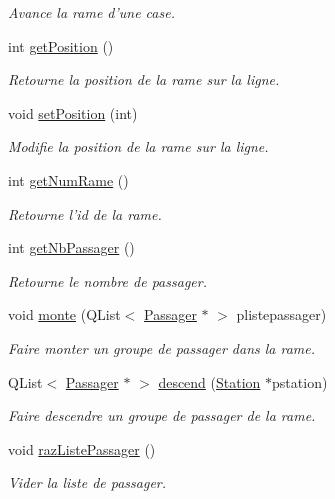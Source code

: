\begin{DoxyCompactItemize}
\begin{DoxyCompactList}\small\item\em Avance la rame d'une case. \item\end{DoxyCompactList}\item 
int \hyperlink{classRame_a69a35184fb6ae56508438c553f096dd2}{getPosition} ()
\begin{DoxyCompactList}\small\item\em Retourne la position de la rame sur la ligne. \item\end{DoxyCompactList}\item 
void \hyperlink{classRame_a2334e438ad1f3e3f93d0580f7f220411}{setPosition} (int)
\begin{DoxyCompactList}\small\item\em Modifie la position de la rame sur la ligne. \item\end{DoxyCompactList}\item 
int \hyperlink{classRame_aa37e23c49eadb05d1bb5c08a73f7b751}{getNumRame} ()
\begin{DoxyCompactList}\small\item\em Retourne l'id de la rame. \item\end{DoxyCompactList}\item 
int \hyperlink{classRame_a6a7326b0c9ea2eb2fb2954d6aa8aeabb}{getNbPassager} ()
\begin{DoxyCompactList}\small\item\em Retourne le nombre de passager. \item\end{DoxyCompactList}\item 
void \hyperlink{classRame_a8bc41267a14836e1e95cd59f5ac3def6}{monte} (QList$<$ \hyperlink{classPassager}{Passager} $\ast$ $>$ plistepassager)
\begin{DoxyCompactList}\small\item\em Faire monter un groupe de passager dans la rame. \item\end{DoxyCompactList}\item 
QList$<$ \hyperlink{classPassager}{Passager} $\ast$ $>$ \hyperlink{classRame_a1ed8e8d1cee489bead9aa2b4b0fb6ca6}{descend} (\hyperlink{classStation}{Station} $\ast$pstation)
\begin{DoxyCompactList}\small\item\em Faire descendre un groupe de passager de la rame. \item\end{DoxyCompactList}\item 
\hypertarget{classRame_aa2541afe9a8f16d929803812048a323f}{
void \hyperlink{classRame_aa2541afe9a8f16d929803812048a323f}{razListePassager} ()}
\label{classRame_aa2541afe9a8f16d929803812048a323f}

\begin{DoxyCompactList}\small\item\em Vider la liste de passager. \item\end{DoxyCompactList}\end{DoxyCompactItemize}
